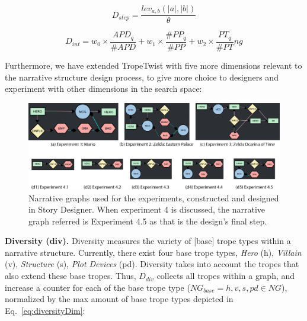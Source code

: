 \begin{equation}
\label{eq:StepDim}
D_{step} =  \frac{lev_{a,b} (|a|, |b|)}{\theta}
\end{equation}

\begin{equation}
\label{eq:interesting_fitness}
D_{int} = w_{0} \times \frac{APD_{q}}{\#APD} + w_{1} \times \frac{\#PP_{q}}{\#PP} +  w_{2} \times \frac{PT_{q}}{\#PT}ng
\end{equation}

Furthermore, we have extended TropeTwist with five more dimensions relevant to the narrative structure design process, to give more choice to designers and experiment with other dimensions in the search space:




\begin{figure}[t]
    \centering
    \includegraphics[width=\textwidth]{figures/example-experiments.png}
    \caption{Narrative graphs used for the experiments, constructed and designed in Story Designer. When experiment 4 is discussed, the narrative graph referred is Experiment 4.5 as that is the design's final step.}
    \label{fig:examples}
\end{figure}

\textbf{Diversity (div).} Diversity measures the variety of [base] trope types within a narrative structure. Currently, there exist four base trope types, \textit{Hero} (h), \textit{Villain} (v), \textit{Structure} (s), \textit{Plot Devices} (pd). Diversity takes into account the tropes that also extend these base tropes. Thus, $D_{div}$ collects all tropes within a graph, and increase a counter for each of the base trope type ($NG_{base} = h, v, s, pd \in NG$), normalized by the max amount of base trope types depicted in Eq.~\ref{eq:diversityDim}:

